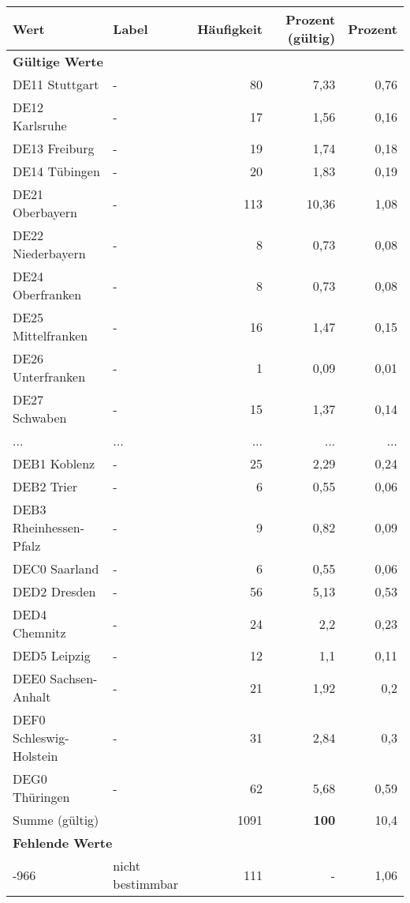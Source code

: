      \begin{longtable}{Xlrrr}
     \toprule
     \textbf{Wert} & \textbf{Label} & \textbf{Häufigkeit} & \textbf{Prozent (gültig)} & \textbf{Prozent} \\
     \endhead
     \midrule
     \multicolumn{5}{l}{\textbf{Gültige Werte}}\\
        \multicolumn{1}{X}{DE11 Stuttgart} & - & 80 & 7,33 & 0,76 \\
        \multicolumn{1}{X}{DE12 Karlsruhe} & - & 17 & 1,56 & 0,16 \\
        \multicolumn{1}{X}{DE13 Freiburg} & - & 19 & 1,74 & 0,18 \\
        \multicolumn{1}{X}{DE14 Tübingen} & - & 20 & 1,83 & 0,19 \\
        \multicolumn{1}{X}{DE21 Oberbayern} & - & 113 & 10,36 & 1,08 \\
        \multicolumn{1}{X}{DE22 Niederbayern} & - & 8 & 0,73 & 0,08 \\
        \multicolumn{1}{X}{DE24 Oberfranken} & - & 8 & 0,73 & 0,08 \\
        \multicolumn{1}{X}{DE25 Mittelfranken} & - & 16 & 1,47 & 0,15 \\
        \multicolumn{1}{X}{DE26 Unterfranken} & - & 1 & 0,09 & 0,01 \\
        \multicolumn{1}{X}{DE27 Schwaben} & - & 15 & 1,37 & 0,14 \\
       ... & ... & ... & ... & ... \\
        \multicolumn{1}{X}{DEB1 Koblenz} & - & 25 & 2,29 & 0,24 \\
        \multicolumn{1}{X}{DEB2 Trier} & - & 6 & 0,55 & 0,06 \\
        \multicolumn{1}{X}{DEB3 Rheinhessen-Pfalz} & - & 9 & 0,82 & 0,09 \\
        \multicolumn{1}{X}{DEC0 Saarland} & - & 6 & 0,55 & 0,06 \\
        \multicolumn{1}{X}{DED2 Dresden} & - & 56 & 5,13 & 0,53 \\
        \multicolumn{1}{X}{DED4 Chemnitz} & - & 24 & 2,2 & 0,23 \\
        \multicolumn{1}{X}{DED5 Leipzig} & - & 12 & 1,1 & 0,11 \\
        \multicolumn{1}{X}{DEE0 Sachsen-Anhalt} & - & 21 & 1,92 & 0,2 \\
        \multicolumn{1}{X}{DEF0 Schleswig-Holstein} & - & 31 & 2,84 & 0,3 \\
        \multicolumn{1}{X}{DEG0 Thüringen} & - & 62 & 5,68 & 0,59 \\
     \midrule
      \multicolumn{2}{l}{Summe (gültig)} & 1091 &
      \textbf{100} &
         10,4 \\
     \multicolumn{5}{l}{\textbf{Fehlende Werte}}\\
       -966 & nicht bestimmbar & 111 & - & 1,06 \\


\end{longtable}
